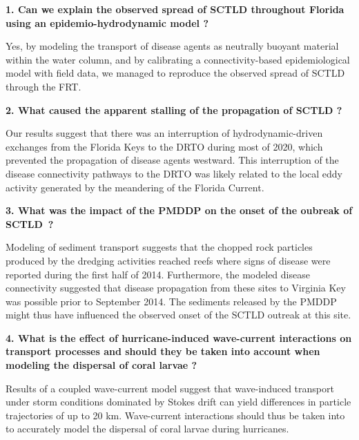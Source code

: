\begin{list}{}{%
    \setlength{\leftmargin}{0in}%
    }
    \item \textbf{1. Can we explain the observed spread of SCTLD throughout Florida using an epidemio-hydrodynamic model ?}
    \begin{list}{}{\setlength{\topsep}{0pt}}
        \item Yes, by modeling the transport of disease agents as neutrally buoyant material within the water column, and by calibrating a connectivity-based epidemiological model with field data, we managed to reproduce the observed spread of SCTLD through the FRT. 
    \end{list}
    \item \textbf{2. What caused the apparent stalling of the propagation of SCTLD ?}
    \begin{list}{}{\setlength{\topsep}{0pt}}
        \item Our results suggest that there was an interruption of hydrodynamic-driven exchanges from the Florida Keys to the DRTO during most of 2020, which prevented the propagation of disease agents westward. This interruption of the disease connectivity pathways to the DRTO was likely related to the local eddy activity generated by the meandering of the Florida Current.
    \end{list}
    \item \textbf{3. What was the impact of the PMDDP on the onset of the oubreak of SCTLD~?}
    \begin{list}{}{\setlength{\topsep}{0pt}}
        \item Modeling of sediment transport suggests that the chopped rock particles produced by the dredging activities reached reefs where signs of disease were reported during the first half of 2014. Furthermore, the modeled disease connectivity suggested that disease propagation from these sites to Virginia Key was possible prior to September 2014. The sediments released by the PMDDP might thus have influenced the observed onset of the SCTLD outreak at this site.
    \end{list}
    \item  \textbf{4. What is the effect of hurricane-induced wave-current interactions on transport processes and should they be taken into account when modeling the dispersal of coral larvae ?}
    \begin{list}{}{\setlength{\topsep}{0pt}}
        \item Results of a coupled wave-current model suggest that wave-induced transport under storm conditions dominated by Stokes drift can yield differences in particle trajectories of up to 20 km. Wave-current interactions should thus be taken into to accurately model the dispersal of coral larvae during hurricanes.
    \end{list}
\end{list}


